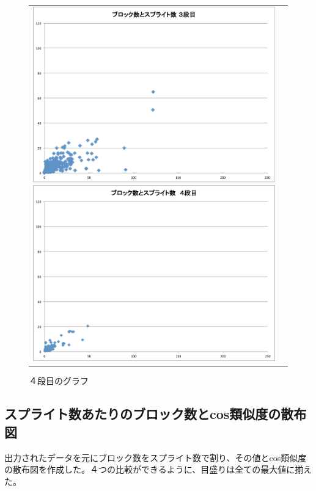 \documentclass[a4paper,10pt,onecolumn,oneside,openany]{jsbook}
\begin{document}
\begin{figure}[h]
\begin{tabular}{cc}
\begin{minipage}[t]{0.45\hsize}
	 \centering
	 \includegraphics[keepaspectratio, scale = 0.25]{block_splite_3.pdf}
	 \caption{３段目のグラフ}
	 \label{third_block}
	\end{minipage}
        \begin{minipage}[t]{0.45\hsize}
	 \centering
	 \includegraphics[keepaspectratio, scale = 0.25]{block_splite_4.pdf}
	 \caption{４段目のグラフ}
	 \label{fourth_block}
	\end{minipage}
 \end{tabular}
 \end{figure}

\newpage
 \subsection{スプライト数あたりのブロック数とcos類似度の散布図}
出力されたデータを元にブロック数をスプライト数で割り、その値とcos類似度の散布図を作成した。４つの比較ができるように、目盛りは全ての最大値に揃えた。
\end{document}
